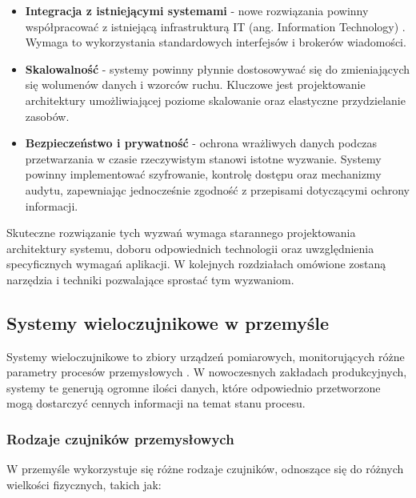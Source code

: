 \begin{itemize}
    \item \textbf{Integracja z istniejącymi systemami} - nowe rozwiązania powinny współpracować z istniejącą infrastrukturą IT (ang. Information Technology) \cite{tanenbaum2011computer}. Wymaga to wykorzystania standardowych interfejsów i brokerów wiadomości.
    
    \item \textbf{Skalowalność} - systemy powinny płynnie dostosowywać się do zmieniających się wolumenów danych i wzorców ruchu. Kluczowe jest projektowanie architektury umożliwiającej poziome skalowanie oraz elastyczne przydzielanie zasobów.
    
    \item \textbf{Bezpieczeństwo i prywatność} - ochrona wrażliwych danych podczas przetwarzania w czasie rzeczywistym stanowi istotne wyzwanie. Systemy powinny implementować szyfrowanie, kontrolę dostępu oraz mechanizmy audytu, zapewniając jednocześnie zgodność z przepisami dotyczącymi ochrony informacji.
\end{itemize}

Skuteczne rozwiązanie tych wyzwań wymaga starannego projektowania architektury systemu, doboru odpowiednich technologii oraz uwzględnienia specyficznych wymagań aplikacji. W kolejnych rozdziałach omówione zostaną narzędzia i techniki pozwalające sprostać tym wyzwaniom.

\subsection{Systemy wieloczujnikowe w przemyśle}
\label{subsec:systemy_wieloczujnikowe}

Systemy wieloczujnikowe to zbiory urządzeń pomiarowych, monitorujących różne parametry procesów przemysłowych \cite{multisensor_systems}.
W nowoczesnych zakładach produkcyjnych, systemy te generują ogromne ilości danych, które odpowiednio przetworzone mogą dostarczyć cennych informacji na temat stanu procesu.

\subsubsection{Rodzaje czujników przemysłowych}
\label{subsubsec:rodzaje_czujnikow}

W przemyśle wykorzystuje się różne rodzaje czujników, odnoszące się do różnych wielkości fizycznych, takich jak:

